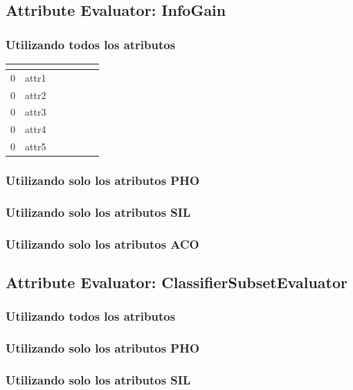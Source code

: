 \documentclass[11pt,a4paper,twoside]{tesis}
\begin{document}
\subsection*{Attribute Evaluator: InfoGain}

\subsubsection{Utilizando todos los atributos}

\begin{table}[h]
\centering
\begin{tabular}{|l|c|c|c|c|c|c|}
\hline
\textbf{}  & \textbf{}  \\ \hline
0  & attr1\\ \hline
0  & attr2\\ \hline
0  & attr3\\ \hline
0 & attr4\\ \hline
0 & attr5\\ \hline
\end{tabular}
\end{table}

\subsubsection{Utilizando solo los atributos PHO}
\subsubsection{Utilizando solo los atributos SIL}
\subsubsection{Utilizando solo los atributos ACO}

\subsection*{Attribute Evaluator: ClassifierSubsetEvaluator}

\subsubsection{Utilizando todos los atributos}
\subsubsection{Utilizando solo los atributos PHO}
\subsubsection{Utilizando solo los atributos SIL}
\end{document}
